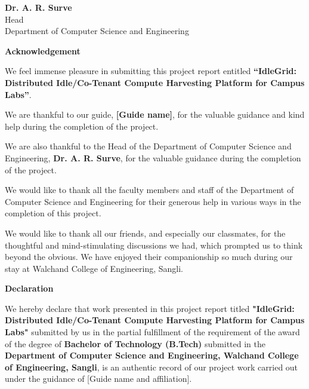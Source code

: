 \documentclass{article}
\begin{document}
\vspace{1.5cm}
\begin{center}
	\textbf{Dr. A. R. Surve}
	\\ Head
	\\ Department of Computer Science and Engineering
\end{center}

	\pagebreak
	
	
	\pagebreak
		\pagebreak
	\begin{center}
	\Huge \textbf {\color {blue}Acknowledgement} \\
	\end{center}
	\vspace{1cm}
	{
	\onehalfspacing
	\setlength{\parindent}{2em}
	\setlength{\parskip}{0.8em}

We feel immense pleasure in submitting this project report entitled \textbf{``IdleGrid: Distributed Idle/Co-Tenant Compute Harvesting Platform for Campus Labs''}.

We are thankful to our guide, \textbf{[Guide name]}, for the valuable guidance and kind help during the completion of the project.

We are also thankful to the Head of the Department of Computer Science and Engineering, \textbf{Dr. A. R. Surve}, for the valuable guidance during the completion of the project.

We would like to thank all the faculty members and staff of the Department of Computer Science and Engineering for their generous help in various ways in the completion of this project.

We would like to thank all our friends, and especially our classmates, for the thoughtful and mind-stimulating discussions we had, which prompted us to think beyond the obvious. We have enjoyed their companionship so much during our stay at Walchand College of Engineering, Sangli.

	}
	
	\pagebreak
	\begin{center}
		\Huge \textbf{Declaration} \\
	\end{center}
	\vspace{1cm}
	\par 
	\setlength{\parindent}{8em}
	\doublespacing
	\doublespacing
    \noindent
We hereby declare that work presented in this project report titled 
\textbf {"IdleGrid: Distributed Idle/Co-Tenant Compute Harvesting Platform for Campus Labs"}
 submitted by us in the partial fulfillment of the requirement of the award of the degree of \textbf{Bachelor of Technology (B.Tech)} submitted in the \textbf{Department of Computer Science and Engineering, Walchand College of Engineering, Sangli}, is an authentic record of our project work carried out under the guidance of [Guide name and affiliation].
	
\end{document}
